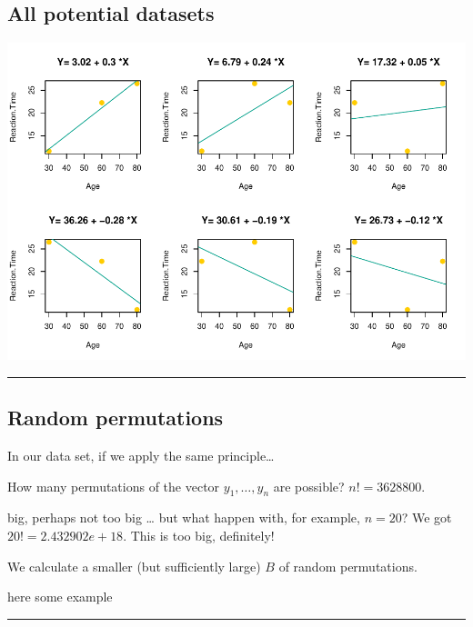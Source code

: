 \documentclass[]{article}
\begin{document}
\hypertarget{all-potential-datasets}{%
\subsection{All potential datasets}\label{all-potential-datasets}}

\begin{center}\includegraphics{inference_booklet_files/figure-latex/unnamed-chunk-8-1} \end{center}

\begin{center}\rule{0.5\linewidth}{\linethickness}\end{center}

\hypertarget{random-permutations}{%
\subsection{Random permutations}\label{random-permutations}}

In our data set, if we apply the same principle\ldots{}

How many permutations of the vector \(y_1,\ldots,y_n\) are possible?
\(n!=3628800\).

big, perhaps not too big \ldots{} but what happen with, for example,
\(n=20\)? We got \(20!=2.432902e+18\). This is too big, definitely!

We calculate a smaller (but sufficiently large) \(B\) of random
permutations.

here some example

\begin{center}\rule{0.5\linewidth}{\linethickness}\end{center}
\end{document}
